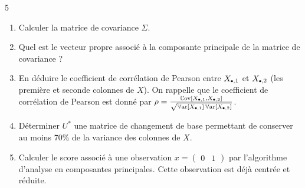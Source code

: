 \documentclass[solutions]{../cc}
\newcommand{\bigdot}{\scalebox{0.6}{$\bullet$}}
\begin{document}
\begin{exopoints}{5}
		\begin{enumerate}
			\item Calculer la matrice de covariance $\Sigma$.
			\item Quel est le vecteur propre associé à la composante principale de la matrice de covariance ?
			\item En déduire le coefficient de corrélation de Pearson entre $X_{\bigdot,1}$ et $X_{\bigdot,2}$ (les première et seconde colonnes de $X$). On rappelle que le coefficient de corrélation de Pearson est donné par $\rho = \frac{\operatorname{\mathbb{C}ov}[X_{\bigdot,1}, X_{\bigdot,2}]}{\sqrt{\operatorname{\mathbb{V}ar}[X_{\bigdot,1}] \operatorname{\mathbb{V}ar}[X_{\bigdot,2}]}}$.
			\item Déterminer $U^*$ une matrice de changement de base permettant de conserver au moins 70\% de la variance des colonnes de $X$.
			\item Calculer le score associé à une observation $x = \begin{pmatrix}0 & 1\end{pmatrix}$ par l'algorithme d'analyse en composantes principales. Cette observation est déjà centrée et réduite.
		\end{enumerate}
		
	\end{exopoints}
\end{document}
